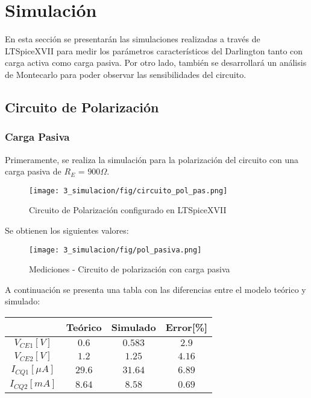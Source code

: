 \chapter{Simulación}
En esta sección se presentarán las simulaciones realizadas a través de LTSpiceXVII para medir los parámetros 
característicos del Darlington tanto con carga activa como carga pasiva. Por otro lado, también se desarrollará 
un análisis de Montecarlo para poder observar las sensibilidades del circuito.


\section{Circuito de Polarización}

\subsection{Carga Pasiva}

Primeramente, se realiza la simulación para la polarización del circuito con una carga pasiva de $R_E$ = $900 \Omega$.
\begin{figure}[H]
    \centering
    \texttt{[image: 3\_simulacion/fig/circuito\_pol\_pas.png]}
    \label{circuito_pol_pas}
    \caption{Circuito de Polarización configurado en LTSpiceXVII}
\end{figure}

Se obtienen los siguientes valores:

\begin{figure}[H]
    \centering
    \texttt{[image: 3\_simulacion/fig/pol\_pasiva.png]}
    \label{mediciones_pol_pas}
    \caption{Mediciones - Circuito de polarización con carga pasiva}
\end{figure}

A continuación se presenta una tabla con las diferencias entre el modelo teórico y simulado:

\begin{table}[H]
    \centering
    \begin{tabular}{|c|c|c|c|}
    \hline
                        & Teórico & Simulado & Error[\%] \\ \hline
    $V_{CE1}[V]$        & $0.6$   & $0.583$  & $2.9$    \\ \hline
    $V_{CE2}[V]$        & $1.2$   & $1.25$   & $4.16$   \\ \hline
    $I_{CQ1}[\mu A]$ & $29.6$  & $31.64$  & $6.89$   \\ \hline  
    $I_{CQ2}[mA]$ & $8.64$  & $8.58$  & $0.69$   \\ \hline
    \end{tabular}
    \end{table}


